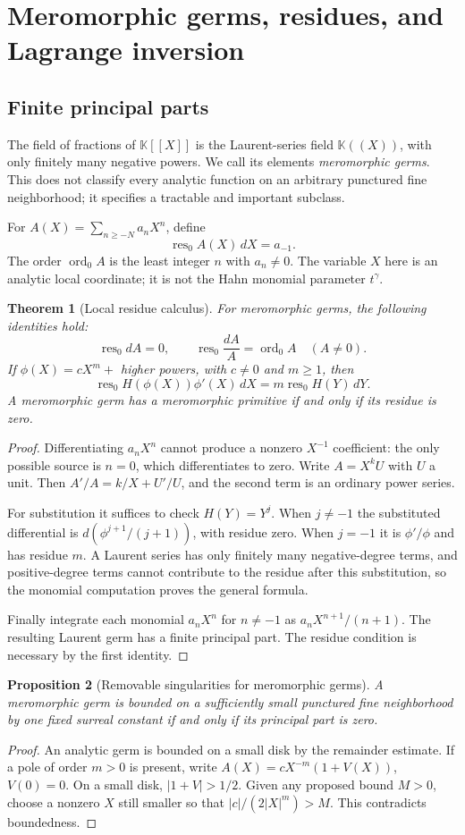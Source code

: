 \documentclass[11pt,a4paper]{article}
\numberwithin{equation}{section}
\newtheorem{theorem}{Theorem}[section]
\newtheorem{proposition}[theorem]{Proposition}
\theoremstyle{definition}
\theoremstyle{remark}
\newcommand{\K}{\mathbb K}
\newcommand{\res}{\operatorname{res}}
\newcommand{\ord}{\operatorname{ord}}
\begin{document}
\section{Meromorphic germs, residues, and Lagrange inversion}
\label{sec:localres}
\subsection{Finite principal parts}
The field of fractions of $\K[[X]]$ is the Laurent-series field $\K((X))$, with only finitely many negative powers. We call its elements \emph{meromorphic germs}. This does not classify every analytic function on an arbitrary punctured fine neighborhood; it specifies a tractable and important subclass.

For $A(X)=\sum_{n\geq-N}a_nX^n$, define
\[
 \res_0 A(X)\,dX=a_{-1}.
\]
The order $\ord_0 A$ is the least integer $n$ with $a_n\ne0$. The variable $X$ here is an analytic local coordinate; it is not the Hahn monomial parameter $t^\gamma$.

\begin{theorem}[Local residue calculus]
\label{thm:localres}
For meromorphic germs, the following identities hold:
\[
 \res_0 dA=0,\qquad
 \res_0\frac{dA}{A}=\ord_0 A\quad(A\ne0).
\]
If $\phi(X)=cX^m+$ higher powers, with $c\ne0$ and $m\geq1$, then
\[
 \res_0 H(\phi(X))\phi'(X)\,dX
 =m\res_0H(Y)\,dY.
\]
A meromorphic germ has a meromorphic primitive if and only if its residue is zero.
\end{theorem}
\begin{proof}
Differentiating $a_nX^n$ cannot produce a nonzero $X^{-1}$ coefficient: the only possible source is $n=0$, which differentiates to zero. Write $A=X^kU$ with $U$ a unit. Then $A'/A=k/X+U'/U$, and the second term is an ordinary power series.

For substitution it suffices to check $H(Y)=Y^j$. When $j\ne-1$ the substituted differential is $d(\phi^{j+1}/(j+1))$, with residue zero. When $j=-1$ it is $\phi'/\phi$ and has residue $m$. A Laurent series has only finitely many negative-degree terms, and positive-degree terms cannot contribute to the residue after this substitution, so the monomial computation proves the general formula.

Finally integrate each monomial $a_nX^n$ for $n\ne-1$ as $a_nX^{n+1}/(n+1)$. The resulting Laurent germ has a finite principal part. The residue condition is necessary by the first identity.
\end{proof}

\begin{proposition}[Removable singularities for meromorphic germs]
A meromorphic germ is bounded on a sufficiently small punctured fine neighborhood by one fixed surreal constant if and only if its principal part is zero.
\end{proposition}
\begin{proof}
An analytic germ is bounded on a small disk by the remainder estimate. If a pole of order $m>0$ is present, write $A(X)=cX^{-m}(1+V(X))$, $V(0)=0$. On a small disk, $|1+V|>1/2$. Given any proposed bound $M>0$, choose a nonzero $X$ still smaller so that $|c|/(2|X|^m)>M$. This contradicts boundedness.
\end{proof}
\end{document}
